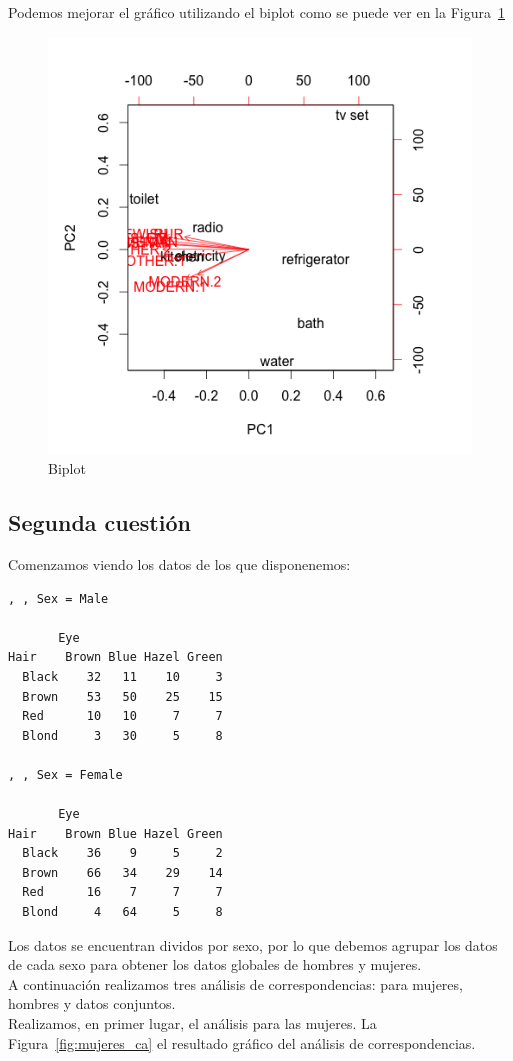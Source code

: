 \documentclass[12pt,a4paper,twoside,openright,titlepage,final]{article}
\begin{document}
Podemos mejorar el gráfico utilizando el biplot como se puede ver en la Figura~\ref{fig:biplot}\\

\begin{figure}[tbph!]
\centering
\includegraphics[width=0.5\linewidth]{imagenes/biplot}
\caption{Biplot}
\label{fig:biplot}
\end{figure}

\subsection{Segunda cuestión}

Comenzamos viendo los datos de los que disponenemos:

\begin{verbatim}
, , Sex = Male

       Eye
Hair    Brown Blue Hazel Green
  Black    32   11    10     3
  Brown    53   50    25    15
  Red      10   10     7     7
  Blond     3   30     5     8

, , Sex = Female

       Eye
Hair    Brown Blue Hazel Green
  Black    36    9     5     2
  Brown    66   34    29    14
  Red      16    7     7     7
  Blond     4   64     5     8

\end{verbatim}

Los datos se encuentran dividos por sexo, por lo que debemos agrupar los datos de cada sexo para obtener los datos globales de hombres y mujeres.\\

A continuación realizamos tres análisis de correspondencias: para mujeres, hombres y datos conjuntos.\\

Realizamos, en primer lugar, el análisis para las mujeres. La Figura~\ref{fig:mujeres_ca} el resultado gráfico del análisis de correspondencias.\\
\end{document}
